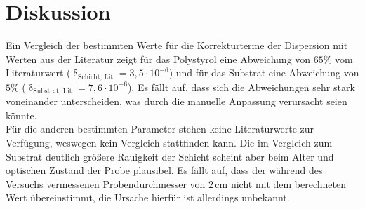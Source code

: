 \section{Diskussion}
Ein Vergleich der bestimmten Werte für die Korrekturterme der Dispersion mit Werten aus der Literatur zeigt für das Polystyrol
eine Abweichung von $65\%$ vom Literaturwert ($\updelta_\text{Schicht, Lit}=3{,}5\cdot10^{-6}$\cite{anleitung}) und für das Substrat eine Abweichung von $5\%$ ($\updelta_\text{Substrat, Lit}=7{,}6\cdot10^{-6}$\cite{anleitung}). Es fällt auf, dass sich die Abweichungen sehr stark voneinander unterscheiden, was durch die manuelle Anpassung verursacht seien könnte.\\ Für die anderen bestimmten Parameter stehen keine Literaturwerte zur Verfügung, weswegen kein Vergleich stattfinden kann. Die im Vergleich zum Substrat deutlich größere Rauigkeit der Schicht scheint aber beim Alter und optischen Zustand der Probe plausibel. Es fällt auf, dass der während des Versuchs vermessenen Probendurchmesser von $2\,\si{\cm}$
nicht mit dem berechneten Wert übereinstimmt, die Ursache hierfür ist allerdings unbekannt.
